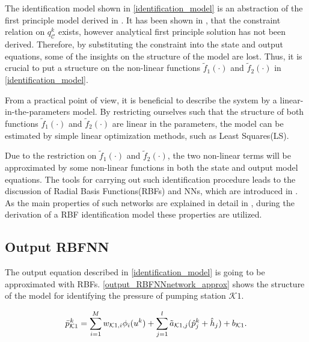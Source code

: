 The identification model shown in \eqref{identification_model} is an abstraction of the first principle model derived in . It has been shown in \cite{oneinput_paper}, that the constraint relation on $q^{k}_{\mathcal{C}}$ exists, however analytical first principle solution has not been derived. Therefore, by substituting the constraint into the state and output equations, some of the insights on the structure of the model are lost. Thus, it is crucial to put a structure on the non-linear functions $\tilde{f}_1(\cdot)$ and $\tilde{f}_2(\cdot)$ in \eqref{identification_model}. 

From a practical point of view, it is beneficial to describe the system by a linear-in-the-parameters model. By restricting ourselves such that the structure of both functions $\tilde{f}_1(\cdot)$ and $\tilde{f}_2(\cdot)$ are linear in the parameters, the model can be estimated by simple linear optimization methods, such as Least Squares(LS). 

Due to the restriction on $\tilde{f}_1(\cdot)$ and $\tilde{f}_2(\cdot)$, the two non-linear terms will be approximated by some non-linear functions in both the state and output model equations. The tools for carrying out such identification procedure leads to the discussion of Radial Basis Functions(RBFs) and NNs, which are introduced in . As the main properties of such networks are explained in detail in , during the derivation of a RBF identification model these properties are utilized. 

 \subsection{Output RBFNN}
\label{output_rbfnn}

The output equation described in \eqref{identification_model} is going to be approximated with RBFs. \eqref{output_RBFNNnetwork_approx} shows the structure of the model for identifying the pressure of pumping station $\mathcal{K}1$.

\vspace{-2mm}

  \begin{equation}
  \label{output_RBFNNnetwork_approx}
\bar{p}^{\hspace{0.2mm} k}_{\mathcal{K}1} = \sum_{i = 1}^M w_{\mathcal{K}1,i} \phi_{i}(u^k) + \sum_{j = 1}^l \tilde{a}_{\mathcal{K}1,j} (\hat{p}^{k}_{j} + \hat{h}_j) + b_{\mathcal{K}1}.
\end{equation}

